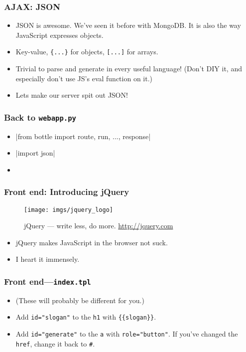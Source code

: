 \documentclass{beamer}
\begin{document}
\begin{frame}[fragile]
  \frametitle{AJAX: JSON}
  \begin{itemize}
  \item JSON is awesome. We've seen it before with MongoDB. It is also
    the way JavaScript expresses objects.
  \item Key-value, \texttt{\{...\}} for objects, \texttt{[...]} for
    arrays.
  \item Trivial to parse and generate in every useful language! (Don't
    DIY it, and especially don't use JS's eval function on it.)
  \item Lets make our server spit out JSON!
  \end{itemize}
\end{frame}

\begin{frame}[fragile]
  \frametitle{Back to \texttt{webapp.py}}
  \begin{itemize}
  \item {}|from bottle import route, run, ..., response| 
  \item {}|import json|
  \item \inputminted[firstline=21,lastline=25]{python}{../steps/03-frontend/04-demo-app/webapp.py}
  \end{itemize}
\end{frame}

\begin{frame}
  \frametitle{Front end: Introducing jQuery}
  \begin{figure}[h!]
    \centering
    \texttt{[image: imgs/jquery\_logo]}
    \caption{jQuery --- write less, do more. \url{http://jquery.com}}
    \label{fig:jquery}
  \end{figure}
  \begin{itemize}
  \item jQuery makes JavaScript in the browser not suck.
  \item I heart it immensely.
  \end{itemize}
\end{frame}

\begin{frame}
  \frametitle{Front end---\texttt{index.tpl}}
  \begin{itemize}
  \item (These will probably be different for you.)
  \item Add \texttt{id="slogan"} to the \texttt{h1} with
    \texttt{\{\{slogan\}\}}.
  \item Add \texttt{id="generate"} to the \texttt{a} with
    \texttt{role="button"}. If you've changed the \texttt{href},
    change it back to \texttt{\#}.
  \end{itemize}
\end{frame}
\end{document}
